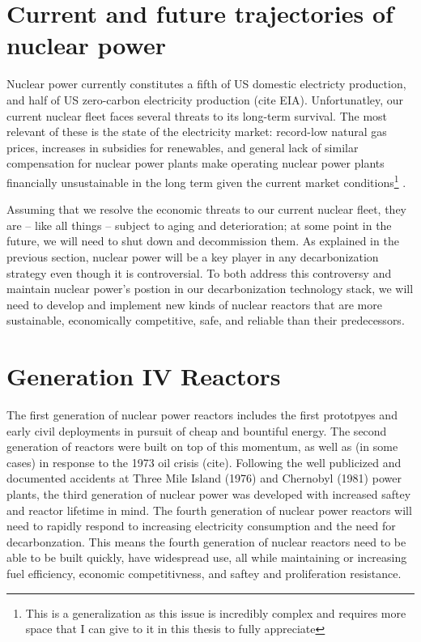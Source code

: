 \section{Current and future trajectories of nuclear power}%
\label{sec:current_and_future_trajectories_of_nuclear_power}
Nuclear power currently constitutes a fifth of US domestic electricty production, and half of US zero-carbon electricity production (cite EIA). Unfortunatley, our current nuclear fleet faces several threats to its long-term survival. The most relevant of these is the state of the electricity market: record-low natural gas prices, increases in subsidies for renewables, and general lack of similar compensation for
nuclear power plants make operating nuclear power plants financially unsustainable in the long term given the current market conditions\footnote{This is a generalization as this issue is incredibly complex and requires more space that I can give to it in this thesis to fully appreciate} \cite{szilard_economic_2016}. %

Assuming that we resolve the economic threats to our current nuclear fleet, they are -- like all things -- subject to aging and deterioration; at some point in the future, we will need to shut down and decommission them. As explained in the previous section, nuclear power will be a key player in any decarbonization strategy even though it is controversial. To both address this controversy and maintain nuclear power's postion in our decarbonization technology stack, we will need to develop and
implement new kinds of nuclear reactors that are more sustainable, economically competitive, safe, and reliable than
their predecessors.
 
\section{Generation IV Reactors}%
\label{sec:generation_iv_reactors}

The first generation of nuclear power reactors includes the first prototpyes and early civil deployments in pursuit of cheap and bountiful energy. The second generation of reactors were built on top of this momentum, as well as (in some cases) in response to the 1973 oil crisis (cite). Following the well publicized and documented accidents at Three Mile Island (1976) and Chernobyl (1981) power plants, the third generation of nuclear power was developed with increased saftey and reactor lifetime
in mind. The fourth generation of nuclear power
reactors will need to rapidly respond to increasing electricity consumption and the need for decarbonzation. This means the fourth generation of nuclear reactors need to be able to be built quickly, have widespread use, all while maintaining or increasing fuel efficiency, economic competitivness, and saftey and proliferation resistance.

